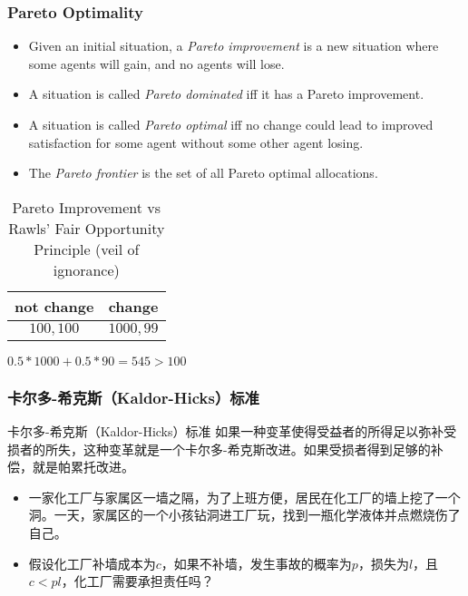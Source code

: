 \documentclass[UTF8,11pt,colorlinks,compress,openany]{beamer}%
\begin{document}
\begin{frame}\frametitle{Pareto Optimality}
\vspace*{-1ex}
\begin{center}
\end{center}\vspace*{-1ex}
\begin{itemize}
	\item Given an initial situation, a \emph{Pareto improvement} is a new situation where some agents will gain, and no agents will lose.
	\item A situation is called \emph{Pareto dominated} iff it has a Pareto improvement.
	\item A situation is called \emph{Pareto optimal} iff no change could lead to improved satisfaction for some agent without some other agent losing.
	\item The \emph{Pareto frontier} is the set of all Pareto optimal allocations.
\end{itemize}
\begin{table}
\begin{tabu}{c|c}
\hline
not change & change\\
\hline
$100,100$ & $1000,99$\\
\hline
\end{tabu}\caption{Pareto Improvement vs Rawls' Fair Opportunity Principle (veil of ignorance)}
$0.5*1000+0.5*90=545>100$
\end{table}
\end{frame}

\begin{frame}\frametitle{卡尔多-希克斯（Kaldor-Hicks）标准}
\begin{block}{卡尔多-希克斯（Kaldor-Hicks）标准}
如果一种变革使得受益者的所得足以弥补受损者的所失，这种变革就是一个卡尔多-希克斯改进。如果受损者得到足够的补偿，就是帕累托改进。
\end{block}
\begin{itemize}
	\item 一家化工厂与家属区一墙之隔，为了上班方便，居民在化工厂的墙上挖了一个洞。一天，家属区的一个小孩钻洞进工厂玩，找到一瓶化学液体并点燃烧伤了自己。
	\item 假设化工厂补墙成本为$c$，如果不补墙，发生事故的概率为$p$，损失为$l$，且$c<pl$，化工厂需要承担责任吗？
\end{itemize}
\end{frame}
\end{document}
